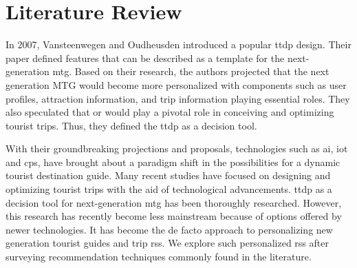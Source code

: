 
\chapter{Literature Review}\label{chapter:literature_review}
In 2007, Vansteenwegen and Oudheusden \parencite{Vansteenwegen2007TheOpportunity} introduced a popular \gls{ttdp} design. Their paper defined features that can be described as a template for the next-generation \gls{mtg}. Based on their research, the authors projected that the next generation MTG would become more personalized with components such as user profiles, attraction information, and trip information playing essential roles. They also speculated that \gls{or} would play a pivotal role in conceiving and optimizing tourist trips. Thus, they defined the \gls{ttdp} as a decision tool.

With their groundbreaking projections and proposals, technologies such as \gls{ai}, \gls{iot} and \gls{cps}, have brought about a paradigm shift in the possibilities for a dynamic tourist destination guide. Many recent studies have focused on designing and optimizing tourist trips with the aid of technological advancements. \Gls{ttdp} as a decision tool for next-generation \gls{mtg} has been thoroughly researched. However, this research has recently become less mainstream because of options offered by newer technologies. It has become the de facto approach to personalizing new generation tourist guides and trip \glspl{rs}. We explore such personalized \glspl{rs} after surveying recommendation techniques commonly found in the literature.


